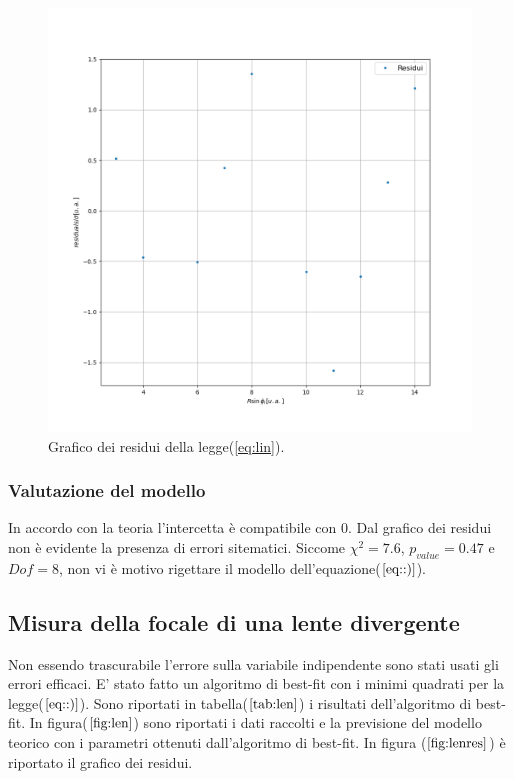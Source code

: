 \documentclass{article}
\begin{document}
\begin{figure}[h!]
	\includegraphics[width=\textwidth]{Dati_raccolti_residui.png}
	\caption{Grafico dei residui della legge(\ref{eq:lin}).}
	\label{fig:plexres}
\end{figure}



\subsubsection{Valutazione del modello}

In accordo con la teoria l'intercetta è compatibile con 0.
Dal grafico dei residui non è evidente la presenza di errori sitematici.
Siccome $\chi^2= 7.6$, $p_{value}= 0.47$  e $Dof= 8$,  non vi è motivo rigettare il modello dell'equazione($\ref{eq::)}$).


\subsection{Misura della focale di una lente divergente}

Non essendo trascurabile l'errore sulla variabile indipendente sono stati usati gli errori efficaci.
E' stato fatto un algoritmo di best-fit con i minimi quadrati per la legge($\ref{eq::)}$).
Sono riportati in tabella($\ref{tab:len}$) i risultati dell'algoritmo di best-fit.
In figura($\ref{fig:len}$) sono riportati i dati raccolti e la previsione del modello teorico con i parametri ottenuti dall'algoritmo di best-fit.
In figura ($\ref{fig:lenres}$) è riportato il grafico dei residui.
\end{document}
